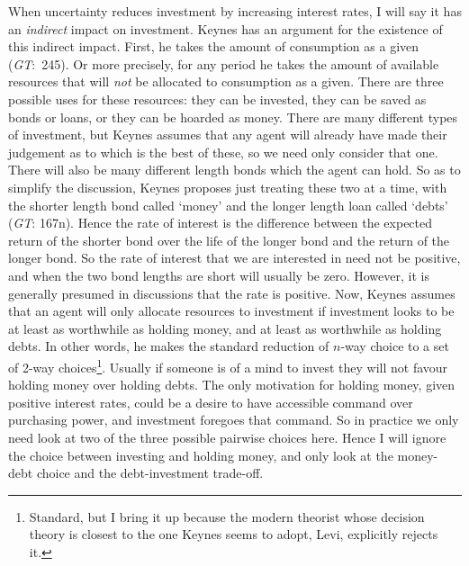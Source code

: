 When uncertainty reduces investment by increasing interest rates, I will say it has an \textit{indirect} impact on investment. Keynes has an argument for the existence of this indirect impact. First, he takes the amount of consumption as a given (\textit{GT}:~245). Or more precisely, for any period he takes the amount of available resources that will \textit{not} be allocated to consumption as a given. There are three possible uses for these resources: they can be invested, they can be saved as bonds or loans, or they can be hoarded as money. There are many different types of investment, but Keynes assumes that any agent will already have made their judgement as to which is the best of these, so we need only consider that one. There will also be many different length bonds which the agent can hold. So as to simplify the discussion, Keynes proposes just treating these two at a time, with the shorter length bond called `money' and the longer length loan called `debts' (\textit{GT}: 167n). Hence the rate of interest is the difference between the expected return of the shorter bond over the life of the longer bond and the return of the longer bond. So the rate of interest that we are interested in need not be positive, and when the two bond lengths are short will usually be zero. However, it is generally presumed in discussions that the rate is positive. Now, Keynes assumes that an agent will only allocate resources to investment if investment looks to be at least as worthwhile as holding money, and at least as worthwhile as holding debts. In other words, he makes the standard reduction of \(n\)-way choice to a set of 2-way choices\footnote{Standard, but I bring it up because the modern theorist whose decision theory is closest to the one Keynes seems to adopt, Levi, explicitly rejects it.}. Usually if someone is of a mind to invest they will not favour holding money over holding debts. The only motivation for holding money, given positive interest rates, could be a desire to have accessible command over purchasing power, and investment foregoes that command. So in practice we only need look at two of the three possible pairwise choices here. Hence I will ignore the choice between investing and holding money, and only look at the money-debt choice and the debt-investment trade-off.

